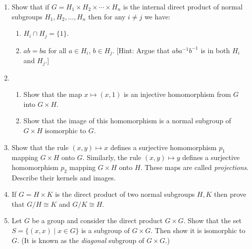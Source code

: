 \documentclass[11pt,oneside]{article}
\newenvironment{problems}
{
 \begin{enumerate}[topsep=1pt,itemsep=0pt,parsep=2pt,leftmargin=0.6cm,%
 label={\arabic*.}, ref=\arabic*] \small
}
{
 \end{enumerate}
}
\theoremstyle{definition}
\begin{document}
\begin{problems}
\item Show that if $G = H_1 \times H_2 \times \cdots \times H_n$ is
  the internal direct product of normal subgroups $H_1, H_2, \dots,
  H_n$ then for any $i \ne j$ we have:
  \begin{enumerate}
  \item $H_i \cap H_j = \{1\}$.
  \item $ab = ba$ for all $a \in H_i$, $b \in H_j$.  [Hint: Argue that
    $aba^{-1}b^{-1}$ is in both $H_i$ and $H_j$.]
  \end{enumerate}



\item 
  \begin{enumerate}
  \item Show that the map $x \mapsto (x,1)$ is an injective
    homomorphism from $G$ into $G \times H$.
  \item Show that the image of this homomorphism is a normal subgroup 
    of $G \times H$ isomorphic to $G$.
  \end{enumerate}


\item{} Show that the rule $(x,y) \mapsto x$ defines a
  surjective homomorphism $p_1$ mapping $G \times H$ onto
  $G$. Similarly, the rule $(x,y) \mapsto y$ defines a surjective
  homomorphism $p_2$ mapping $G\times H$ onto $H$. These maps are
  called \emph{projections}. Describe their kernels and images.

\item If $G = H \times K$ is the direct product of two normal
  subgroups $H,K$ then prove that $G/H \cong K$ and $G/K \cong H$.

\item{} Let $G$ be a group and consider the
  direct product $G \times G$.  Show that the set
  $S = \{ (x,x) \mid x\in G \}$ is a subgroup of $G \times G$. Then
  show it is isomorphic to $G$. (It is known as the \emph{diagonal}
  subgroup of $G \times G$.)



\end{problems}
\end{document}
